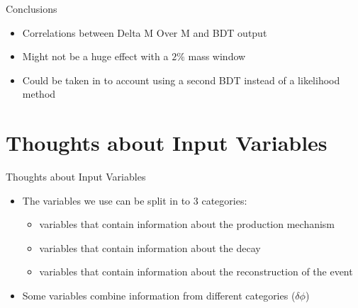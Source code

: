 \documentclass[t, 8pt]{beamer}
\begin{document}
\begin{frame}{Conclusions}

  \begin{itemize}  
  \item Correlations between Delta M Over M and BDT output
  \item Might not be a huge effect with a $2 \%$ mass window
  \item Could be taken in to account using a second BDT instead of a likelihood
  method
  \end{itemize}
\end{frame}

\section{Thoughts about Input Variables}

\begin{frame}{Thoughts about Input Variables}
  \begin{itemize}  
    \item The variables we use can be split in to 3 categories:
    \begin{itemize}  
      \item variables that contain information about the production mechanism
      \item variables that contain information about the decay 
      \item variables that contain information about the reconstruction of the
      event
    \end{itemize}
    \item Some variables combine information from different categories ($\delta
    \phi$)
  \end{itemize}
\end{frame}
\end{document}
